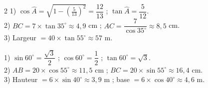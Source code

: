 \begin{multicols}{2}
1) $\cos\widehat A=\sqrt{1-\left(\frac5{13}\right)^{2}}=\dfrac{12}{13}$ ;
$\tan\widehat A=\dfrac5{12}$.\\
2) $BC=7\times\tan35^{\circ}\approx4{,}9$ cm ; $AC=\dfrac7{\cos35^{\circ}}\approx8{,}5$ cm.\\
3) Largeur $=40\times\tan55^{\circ}\approx57$ m.

1) $\sin60^{\circ}=\dfrac{\sqrt3}2$ ; $\cos60^{\circ}=\dfrac12$ ; $\tan60^{\circ}=\sqrt3$.\\
2) $AB=20\times\cos55^{\circ}\approx11{,}5$ cm ; $BC=20\times\sin55^{\circ}\approx16{,}4$
cm.\\
3) Hauteur $=6\times\sin40^{\circ}\approx3{,}9$ m ; base $=6\times\cos40^{\circ}\approx4{,}6$
m.

\end{multicols}
\exercicesBanner
